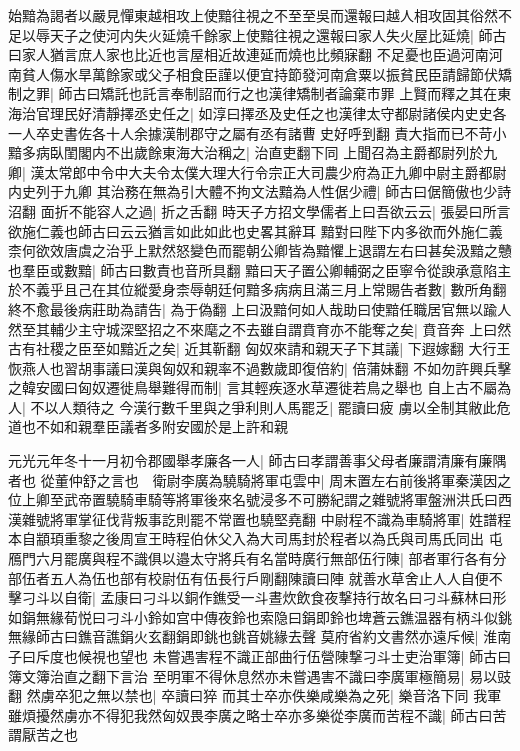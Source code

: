 始黯為謁者以嚴見憚東越相攻上使黯往視之不至至吳而還報曰越人相攻固其俗然不足以辱天子之使河内失火延燒千餘家上使黯往視之還報曰家人失火屋比延燒|{
	師古曰家人猶言庶人家也比近也言屋相近故連延而燒也比頻寐翻}
不足憂也臣過河南河南貧人傷水旱萬餘家或父子相食臣謹以便宜持節發河南倉粟以振貧民臣請歸節伏矯制之罪|{
	師古曰矯託也託言奉制詔而行之也漢律矯制者論棄市罪}
上賢而釋之其在東海治官理民好清靜擇丞史任之|{
	如淳曰擇丞及史任之也漢律太守都尉諸侯内史史各一人卒史書佐各十人余據漢制郡守之屬有丞有諸曹史好呼到翻}
責大指而已不苛小黯多病臥閨閣内不出歲餘東海大治稱之|{
	治直吏翻下同}
上聞召為主爵都尉列於九卿|{
	漢太常郎中令中大夫令太僕大理大行令宗正大司農少府為正九卿中尉主爵都尉内史列于九卿}
其治務在無為引大體不拘文法黯為人性倨少禮|{
	師古曰倨簡傲也少詩沼翻}
面折不能容人之過|{
	折之舌翻}
時天子方招文學儒者上曰吾欲云云|{
	張晏曰所言欲施仁義也師古曰云云猶言如此如此也史畧其辭耳}
黯對曰陛下内多欲而外施仁義柰何欲效唐虞之治乎上默然怒變色而罷朝公卿皆為黯懼上退謂左右曰甚矣汲黯之戇也羣臣或數黯|{
	師古曰數責也音所具翻}
黯曰天子置公卿輔弼之臣寧令從諛承意陷主於不義乎且己在其位縱愛身柰辱朝廷何黯多病病且滿三月上常賜告者數|{
	數所角翻}
終不愈最後病莊助為請告|{
	為于偽翻}
上曰汲黯何如人哉助曰使黯任職居官無以踰人然至其輔少主守城深堅招之不來麾之不去雖自謂賁育亦不能奪之矣|{
	賁音奔}
上曰然古有社稷之臣至如黯近之矣|{
	近其靳翻}
匈奴來請和親天子下其議|{
	下遐嫁翻}
大行王恢燕人也習胡事議曰漢與匈奴和親率不過數歲即復倍約|{
	倍蒲妹翻}
不如勿許興兵擊之韓安國曰匈奴遷徙鳥舉難得而制|{
	言其輕疾逐水草遷徙若鳥之舉也}
自上古不屬為人|{
	不以人類待之}
今漢行數千里與之爭利則人馬罷乏|{
	罷讀曰疲}
虜以全制其敝此危道也不如和親羣臣議者多附安國於是上許和親

元光元年冬十一月初令郡國舉孝廉各一人|{
	師古曰孝謂善事父母者廉謂清廉有廉隅者也}
從董仲舒之言也　衛尉李廣為驍騎將軍屯雲中|{
	周末置左右前後將軍秦漢因之位上卿至武帝置驍騎車騎等將軍後來名號浸多不可勝紀謂之雜號將軍盤洲洪氏曰西漢雜號將軍掌征伐背叛事訖則罷不常置也驍堅堯翻}
中尉程不識為車騎將軍|{
	姓譜程本自顓頊重黎之後周宣王時程伯休父入為大司馬封於程者以為氏與司馬氏同出}
屯鴈門六月罷廣與程不識俱以邉太守將兵有名當時廣行無部伍行陳|{
	部者軍行各有分部伍者五人為伍也部有校尉伍有伍長行戶剛翻陳讀曰陣}
就善水草舍止人人自便不擊刁斗以自衛|{
	孟康曰刁斗以銅作鐎受一斗晝炊飲食夜撃持行故名曰刁斗蘇林曰形如鋗無緣荀悦曰刁斗小鈴如宫中傳夜鈴也索隐曰鋗即鈴也埤蒼云鐎温器有柄斗似銚無緣師古曰鐎音譙鋗火玄翻鋗即銚也銚音姚緣去聲}
莫府省約文書然亦遠斥候|{
	淮南子曰斥度也候視也望也}
未嘗遇害程不識正部曲行伍營陳撃刁斗士吏治軍簿|{
	師古曰簿文簿治直之翻下言治}
至明軍不得休息然亦未嘗遇害不識曰李廣軍極簡易|{
	易以豉翻}
然虜卒犯之無以禁也|{
	卒讀曰猝}
而其士卒亦佚樂咸樂為之死|{
	樂音洛下同}
我軍雖煩擾然虜亦不得犯我然匈奴畏李廣之略士卒亦多樂從李廣而苦程不識|{
	師古曰苦謂厭苦之也}


